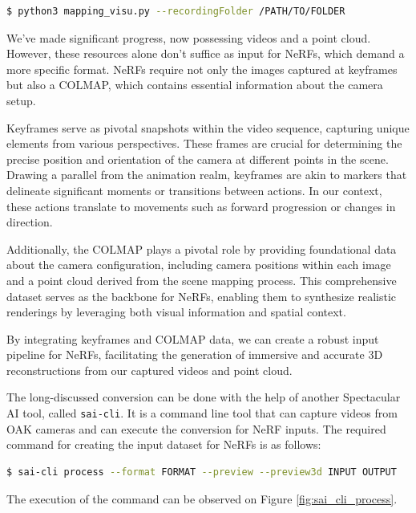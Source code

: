 \begin{lstlisting}[language=bash,frame=single,float=!ht]
$ python3 mapping_visu.py --recordingFolder /PATH/TO/FOLDER
\end{lstlisting}

We've made significant progress, now possessing videos and a point cloud. However, these resources alone don't suffice as input for NeRFs, which demand a more specific format. NeRFs require not only the images captured at keyframes but also a COLMAP, which contains essential information about the camera setup.

Keyframes serve as pivotal snapshots within the video sequence, capturing unique elements from various perspectives. These frames are crucial for determining the precise position and orientation of the camera at different points in the scene. Drawing a parallel from the animation realm\cite{keyframes_in_animation}, keyframes are akin to markers that delineate significant moments or transitions between actions. In our context, these actions translate to movements such as forward progression or changes in direction.

Additionally, the COLMAP plays a pivotal role by providing foundational data about the camera configuration, including camera positions within each image and a point cloud derived from the scene mapping process\cite{colmap}. This comprehensive dataset serves as the backbone for NeRFs, enabling them to synthesize realistic renderings by leveraging both visual information and spatial context.

By integrating keyframes and COLMAP data, we can create a robust input pipeline for NeRFs, facilitating the generation of immersive and accurate 3D reconstructions from our captured videos and point cloud.

The long-discussed conversion can be done with the help of another Spectacular AI tool, called \verb|sai-cli|. It is a command line tool that can capture videos from OAK cameras and can execute the conversion for NeRF inputs. The required command for creating the input dataset for NeRFs is as follows:

\begin{lstlisting}[language=bash,frame=single,float=!ht]
$ sai-cli process --format FORMAT --preview --preview3d INPUT OUTPUT
\end{lstlisting}

The execution of the command can be observed on Figure \ref{fig:sai_cli_process}. 

